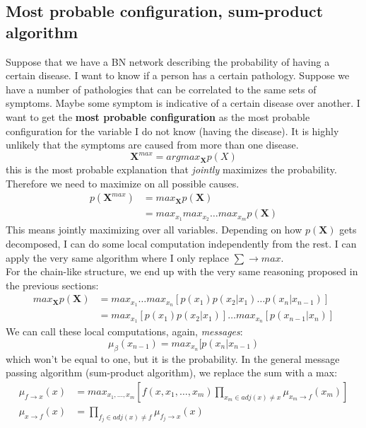 \subsection{Most probable configuration, sum-product algorithm}
Suppose that we have a BN network describing the probability of having a certain
disease. I want to know if a person has a certain pathology. Suppose we have a
number of pathologies that can be correlated to the same sets of symptoms. Maybe
some symptom is indicative of a certain disease over another. I want to get the
\textbf{most probable configuration} as the most probable configuration for the variable
I do not know (having the disease). It is highly unlikely that the symptoms are
caused from more than one disease.
\[
	\textbf{X}^{max}= argmax_{\textbf{X}}p(X)
\]
this is the most probable explanation that \textit{jointly} maximizes the
probability. Therefore we need to maximize on all possible causes.
\begin{align*}
	p(\textbf{X}^{max}) & = max_{\textbf{X}}p(\textbf{X})                  \\
	                    & = max_{x_1}max_{x_2}\dots max_{x_m}p(\textbf{X})
\end{align*}
This means jointly maximizing over all variables. Depending on how $p(\textbf{X})$
gets decomposed, I can do some local computation independently from the rest. I can
apply the very same algorithm where I only replace $\sum \rightarrow max$.\\ For
the chain-like structure, we end up with the very same reasoning proposed in the
previous sections:
\begin{align*}
	max_{\textbf{X}}p(\textbf{X}) & = max_{x_1}\dots max_{x_n}[p(x_{1})p(x_{2}|x_{1})\dots p(x_{n}|x_{n-1})] \\
	                              & = max_{x_1}[p(x_{1})p(x_{2}|x_{1})]\dots max_{x_n}[p(x_{n-1}|x_{n})]
\end{align*}
We can call these local computations, again, \textit{messages}:
\[
	\mu_{\beta} (x_{n-1}) = max_{x_n}[p(x_{n}|x_{n-1})
\]
which won't be equal to one, but it is the probability. In the general message passing
algorithm (sum-product algorithm), we replace the sum with a max:
\begin{align*}
	\mu_{f \rightarrow x}(x) & = max_{x_1, \dots, x_m}\left[ f(x, x_{1}, \dots, x_{m}) \prod_{x_m \in adj(x) \neq x}\mu_{x_m \rightarrow f}(x_{m}) \right] \\
	\mu_{x \rightarrow f}(x) & = \prod_{f_j \in adj(x) \neq f}\mu_{f_j \rightarrow x}(x)
\end{align*}


